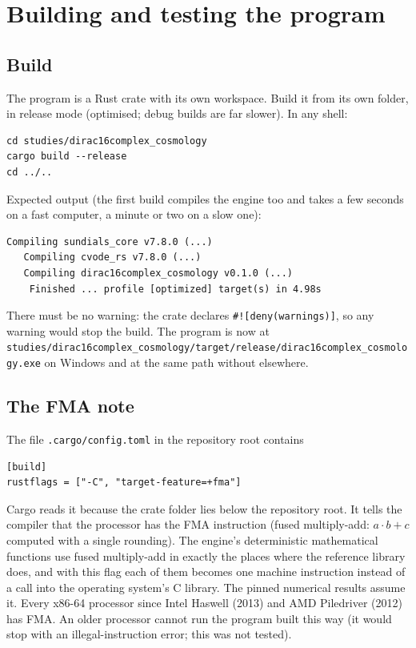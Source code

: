 \documentclass[11pt]{article}
\begin{document}
\section{Building and testing the program}

\subsection{Build}

The program is a Rust crate with its own workspace. Build it from its own folder, in release mode (optimised; debug builds are far slower). In any shell:

\begin{Verbatim}[fontsize=\small]
cd studies/dirac16complex_cosmology
cargo build --release
cd ../..
\end{Verbatim}

Expected output (the first build compiles the engine too and takes a few seconds on a fast computer, a minute or two on a slow one):

\begin{Verbatim}[fontsize=\small]
   Compiling sundials_core v7.8.0 (...)
   Compiling cvode_rs v7.8.0 (...)
   Compiling dirac16complex_cosmology v0.1.0 (...)
    Finished ... profile [optimized] target(s) in 4.98s
\end{Verbatim}

There must be no warning: the crate declares \texttt{\#![deny(\allowbreak{}warnings\allowbreak{})]}, so any warning would stop the build. The program is now at \texttt{studies/\allowbreak{}dirac16c\allowbreak{}omplex\_c\allowbreak{}osmology\allowbreak{}/target/\allowbreak{}release/\allowbreak{}dirac16c\allowbreak{}omplex\_c\allowbreak{}osmology\allowbreak{}.exe} on Windows and at the same path without \texttt{} elsewhere.

\subsection{The FMA note}

The file \texttt{.cargo/c\allowbreak{}onfig.to\allowbreak{}ml} in the repository root contains

\begin{Verbatim}[fontsize=\small]
[build]
rustflags = ["-C", "target-feature=+fma"]
\end{Verbatim}

Cargo reads it because the crate folder lies below the repository root. It tells the compiler that the processor has the FMA instruction (fused multiply-add: $a\cdot b+c$ computed with a single rounding). The engine's deterministic mathematical functions use fused multiply-add in exactly the places where the reference library does, and with this flag each of them becomes one machine instruction instead of a call into the operating system's C library. The pinned numerical results assume it. Every x86-64 processor since Intel Haswell (2013) and AMD Piledriver (2012) has FMA. An older processor cannot run the program built this way (it would stop with an illegal-instruction error; this was not tested).
\end{document}
